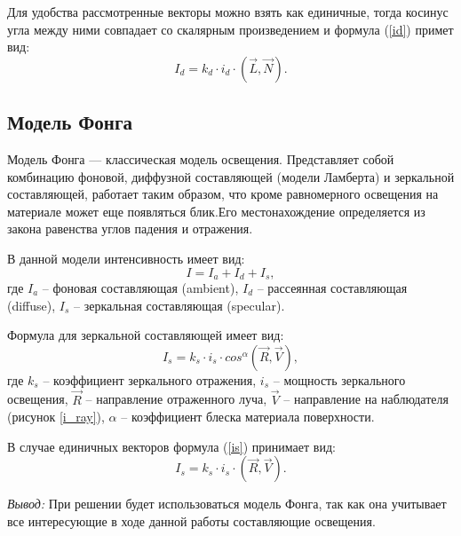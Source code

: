 Для удобства рассмотренные векторы можно взять как единичные, тогда косинус угла между ними совпадает со скалярным произведением и формула (\ref{id}) примет вид:
\begin{equation}
	I_{d} = k_{d} \cdot i_{d} \cdot (\vec{L}, \vec{N}).
\end{equation}

\subsection{Модель Фонга}

Модель Фонга --- классическая модель освещения. Представляет собой комбинацию  фоновой, диффузной составляющей (модели Ламберта) и зеркальной составляющей, работает таким образом, что кроме равномерного освещения на материале может еще появляться блик.Его местонахождение определяется из закона равенства углов падения и отражения.

В данной модели интенсивность имеет вид:
\begin{equation}\label{intensity}
	I = I_{a} + I_{d} + I_{s},
\end{equation}
где $I_{a}$ -- фоновая составляющая (ambient), $I_{d}$ -- рассеянная составляющая (diffuse), $I_{s}$ -- зеркальная составляющая (specular).

Формула для зеркальной составляющей имеет вид:
\begin{equation}\label{is}
	I_{s} = k_{s} \cdot i_{s} \cdot cos^\alpha(\vec{R}, \vec{V}),
\end{equation}
где $k_{s}$ -- коэффициент зеркального отражения, $i_{s}$ -- мощность зеркального освещения, $\vec{R}$ -- направление отраженного луча, $\vec{V}$ -- направление на наблюдателя (рисунок \ref{i_ray}), $\alpha$ -- коэффициент блеска материала поверхности.

В случае единичных векторов формула (\ref{is}) принимает вид:
\begin{equation}
	I_s = k_s \cdot i_s \cdot (\vec{R}, \vec{V}).
\end{equation}\newline

\textit{Вывод:} При решении будет использоваться модель Фонга, так как она учитывает все интересующие в ходе данной работы составляющие освещения.


